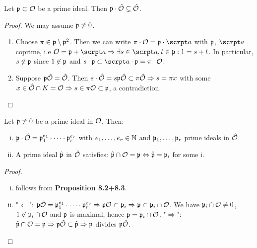 \begin{Prop}
	Let $\mathfrak{p} \subset \mathcal{O}$ be a prime ideal. Then $\mathfrak{p} \cdot \hat{\mathcal{O}} \subsetneq \hat{\mathcal{O}}$.
\end{Prop}
\begin{proof}
	We may assume $\mathfrak{p} \neq 0 $.
	\begin{enumerate}[(1)]
		\item Choose $\pi \in \mathfrak{p} \setminus \mathfrak{p}^2$. Then we can write $\pi \cdot \O = \p \cdot \a$ with $\mathfrak{p}$, $\a$ coprime, i.e $\O = \p + \a \Rightarrow \exists s\in\a, t\in\p: 1=s+t$. In particular, $s\not\in \mathfrak{p}$ since $1 \not\in \mathfrak{p}$ and $s\cdot \p \subset \a \cdot \p = \pi \cdot \O$.
		
		\item Suppose $\mathfrak{p}\hat{\mathcal{O}} = \hat{\mathcal{O}}$. Then $s \cdot \hat{\mathcal{O}} = s\mathfrak{p}\hat{\mathcal{O}} \subset \pi\hat{\mathcal{O}} \Rightarrow s = \pi x$ with some $x \in \hat{\mathcal{O}} \cap K = \mathcal{O} \Rightarrow s \in \pi\mathcal{O} \subset \mathfrak{p}$, a contradiction.
	\end{enumerate}
\end{proof}

\begin{Bem}
	Let $\mathfrak{p} \neq 0$ be a prime ideal in $\mathcal{O}$. Then:
	\begin{enumerate}[(i)]
		\item $\mathfrak{p} \cdot \hat{\mathcal{O}} = \mathfrak{p}_1^{e_1} \cdot \dots \cdot \mathfrak{p}_r^{e_r}$ with $e_1,\dots,e_r \in \mathbb{N}$ and $\mathfrak{p}_1, \dots, \mathfrak{p}_r$ prime ideals in $\hat{\mathcal{O}}$.
		
		\item A prime ideal $\hat{\mathfrak{p}}$ in $\hat{\mathcal{O}}$ satisfies: $\hat{\mathfrak{p}} \cap \mathcal{O} = \mathfrak{p} \Leftrightarrow \hat{\mathfrak{p}} = \mathfrak{p}_i$ for some i.
	\end{enumerate}
\end{Bem}
\begin{proof}
	\begin{enumerate}[(i)]
		\item follows from  \textbf{Proposition 8.2+8.3}.
		
		\item "$\Leftarrow$": $\mathfrak{p}\hat{\mathcal{O}} = \mathfrak{p}_1^{e_1} \cdot \dots \cdot \mathfrak{p}_r^{e_r} \Rightarrow \mathfrak{p}\mathcal{O} \subset \mathfrak{p}_i \Rightarrow \mathfrak{p} \subset \mathfrak{p}_i \cap \mathcal{O}$. We have $\mathfrak{p}_i \cap \mathcal{O} \neq 0$, $1 \not\in \mathfrak{p}_i \cap \mathcal{O}$ and $\mathfrak{p}$ is maximal, hence $\mathfrak{p} = \mathfrak{p}_i \cap \mathcal{O}$.
		"$\Rightarrow$": $\hat{\mathfrak{p}} \cap \mathcal{O} = \mathfrak{p} \Rightarrow \mathfrak{p}\hat{\mathcal{O}} \subset \hat{\mathfrak{p}} \Rightarrow \mathfrak{p}$ divides $\mathfrak{p}\hat{\mathcal{O}}$.
	\end{enumerate}
\end{proof}

